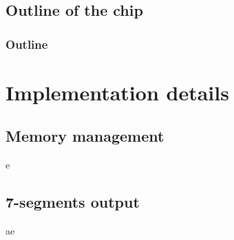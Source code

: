 \documentclass[slidestop]{beamer}
\begin{document}
\subsection{Outline of the chip}
\begin{frame}
    \frametitle{Outline}
    
\end{frame}

\section{Implementation details}

\subsection{Memory management}

\begin{frame}
e
\end{frame}

\subsection{7-segments output}

\begin{frame}
ae
\end{frame}
\end{document}

